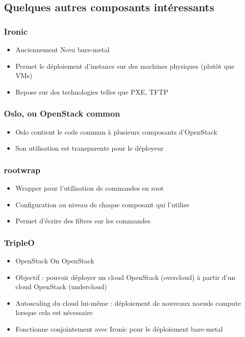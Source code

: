   \subsection[Les autres]{Quelques autres composants intéressants}

  \begin{frame}
    \frametitle{Ironic}
    \begin{itemize}
      \item Anciennement Nova bare-metal
      \item Permet le déploiement d'instance sur des machines physiques (plutôt que VMs)
      \item Repose sur des technologies telles que PXE, TFTP
    \end{itemize}
  \end{frame}

  \begin{frame}
    \frametitle{Oslo, ou OpenStack common}
    \begin{itemize}
      \item Oslo contient le code commun à plusieurs composants d'OpenStack
      \item Son utilisation est transparente pour le déployeur
    \end{itemize}
  \end{frame}

  \begin{frame}
    \frametitle{rootwrap}
    \begin{itemize}
      \item Wrapper pour l'utilisation de commandes en root
      \item Configuration au niveau de chaque composant qui l'utilise
      \item Permet d'écrire des filtres sur les commandes
    \end{itemize}
  \end{frame}

  \begin{frame}
    \frametitle{TripleO}
    \begin{itemize}
      \item OpenStack On OpenStack
      \item Objectif : pouvoir déployer un cloud OpenStack (overcloud) à partir d'un cloud OpenStack (undercloud)
      \item Autoscaling du cloud lui-même : déploiement de nouveaux noeuds compute lorsque cela est nécessaire
      \item Fonctionne conjointement avec Ironic pour le déploiement bare-metal
    \end{itemize}
  \end{frame}

